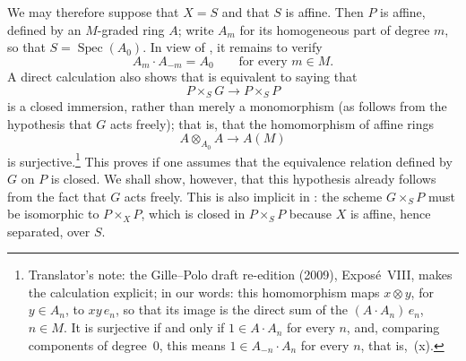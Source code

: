 We may therefore suppose that \(X=S\) and that \(S\) is affine. Then
\(P\) is affine, defined by an \(M\)-graded ring \(A\); write \(A_m\) for
its homogeneous part of degree \(m\), so that
\(S=\operatorname{Spec}(A_0)\). In view of
, it remains to verify
\[
  A_m\cdot A_{-m}=A_0
  \qquad\text{for every \(m\in M\).}
  \tag{x}\label{sga3:viii:theorem:5:1:eq:x:01}
\]
A direct calculation also shows that
 is equivalent to saying
that
\[
  P\times_SG\longrightarrow P\times_SP
\]
is a closed immersion, rather than merely a monomorphism (as follows
from the hypothesis that \(G\) acts freely); that is, that the
homomorphism of affine rings
\[
  A\otimes_{A_0}A\longrightarrow A(M)
\]
is surjective.\footnote{Translator's note: the Gille--Polo draft re-edition (2009), Expos\'e~VIII,
makes the calculation explicit; in our words: this homomorphism maps \(x\otimes y\), for
\(y\in A_n\), to \(xy\,e_n\), so that its image is the direct sum of the \((A\cdot A_n)\,e_n\),
\(n\in M\). It is surjective if and only if \(1\in A\cdot A_n\) for every \(n\), and, comparing
components of degree~\(0\), this means \(1\in A_{-n}\cdot A_n\) for every \(n\), that is,~(x).}
This proves  if one assumes that
the equivalence relation defined by \(G\) on \(P\) is closed. We shall
show, however, that this hypothesis already follows from the fact that
\(G\) acts freely. This is also implicit in
: the scheme
\(G\times_SP\) must be isomorphic to \(P\times_XP\), which is closed in
\(P\times_SP\) because \(X\) is affine, hence separated, over \(S\).

